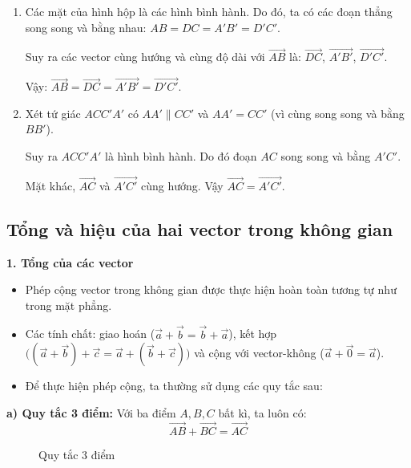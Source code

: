 \documentclass[12pt]{article}
\begin{document}
	\begin{loigiai}
		\begin{enumerate}[label=\alph*)]
			\item Các mặt của hình hộp là các hình bình hành. Do đó, ta có các đoạn thẳng song song và bằng nhau: $AB = DC = A'B' = D'C'$.
			
			Suy ra các vector cùng hướng và cùng độ dài với $\overrightarrow{AB}$ là: $\overrightarrow{DC}$, $\overrightarrow{A'B'}$, $\overrightarrow{D'C'}$.
			
			Vậy: $\overrightarrow{AB} = \overrightarrow{DC} = \overrightarrow{A'B'} = \overrightarrow{D'C'}$.
			
			\item Xét tứ giác $ACC'A'$ có $AA' \parallel CC'$ và $AA' = CC'$ (vì cùng song song và bằng $BB'$).
			
			Suy ra $ACC'A'$ là hình bình hành. Do đó đoạn $AC$ song song và bằng $A'C'$. 
			
			Mặt khác, $\overrightarrow{AC}$ và $\overrightarrow{A'C'}$ cùng hướng. Vậy $\overrightarrow{AC} = \overrightarrow{A'C'}$.
		\end{enumerate}
	\end{loigiai}
	
	\subsection{Tổng và hiệu của hai vector trong không gian}
	
	\textbf{1. Tổng của các vector}
	\begin{itemize}
		\item Phép cộng vector trong không gian được thực hiện hoàn toàn tương tự như trong mặt phẳng.
		\item Các tính chất: giao hoán ($\vec{a} + \vec{b} = \vec{b} + \vec{a}$), kết hợp $\big((\vec{a} + \vec{b}) + \vec{c} = \vec{a} + (\vec{b} + \vec{c})\big)$ và cộng với vector-không ($\vec{a} + \vec{0} = \vec{a}$).
		\item Để thực hiện phép cộng, ta thường sử dụng các quy tắc sau:
	\end{itemize}
	
	\textbf{a) Quy tắc 3 điểm:} Với ba điểm $A, B, C$ bất kì, ta luôn có: 
	$$ \overrightarrow{AB} + \overrightarrow{BC} = \overrightarrow{AC} $$
	
	\begin{figure}[H]
		\centering
		\caption{Quy tắc 3 điểm}
	\end{figure}
	
\end{document}
